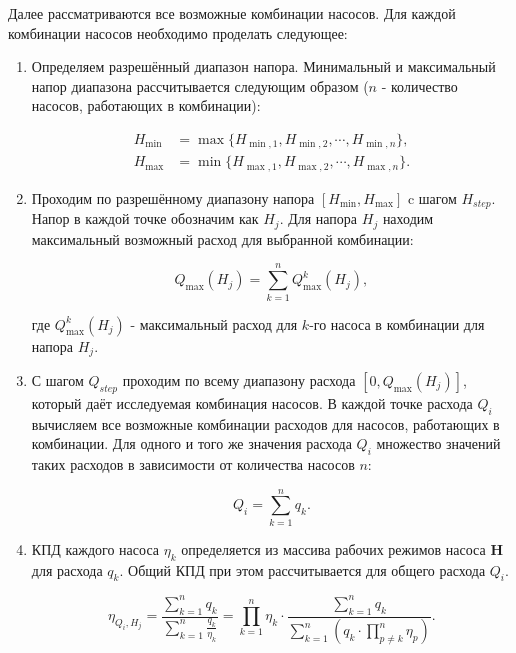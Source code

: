 \documentclass[a4paper, 12pt]{article}
\begin{document}
    Далее рассматриваются все возможные комбинации насосов. Для каждой
комбинации насосов необходимо проделать следующее: 

\begin{enumerate}

\item
Определяем разрешённый диапазон напора. Минимальный и максимальный напор диапазона
рассчитывается следующим образом (\(n\) - количество насосов, работающих
в комбинации):

\begin{equation}
	\begin{aligned}
		H_{\min} &= \max\{H_{\min,1}, H_{\min,2}, \cdots, H_{\min,n}\}, \\
		H_{\max} &= \min\{H_{\max,1}, H_{\max,2}, \cdots, H_{\max,n}\}.
	\end{aligned}
\end{equation}


\item
Проходим по разрешённому диапазону напора \([H_{\min}, H_{\max}]\) c
  шагом \(H_{step}\). Напор в каждой точке обозначим как \(H_j\). Для
  напора \(H_j\) находим максимальный возможный расход для выбранной комбинации:

\begin{equation}
	Q_{\max}(H_j) = \sum_{k=1}^{n} Q_{\max}^k(H_j),
\end{equation}

\noindent где $Q_{\max}^k(H_j)$ - максимальный расход для $k$-го насоса в комбинации для напора $H_j$.

\item
  С шагом \(Q_{step}\) проходим по всему диапазону
  расхода \([0, Q_{\max}(H_j)]\), который даёт исследуемая комбинация
  насосов. В каждой точке расхода \(Q_i\) вычисляем все возможные
  комбинации расходов для насосов, работающих в комбинации. Для одного и
  того же значения расхода \(Q_i\) множество значений таких расходов в
  зависимости от количества насосов \(n\):

\begin{equation}
	Q_i = \sum_{k=1}^{n} q_k.
\end{equation}


\item
  КПД каждого насоса $\eta_k$ определяется из массива рабочих режимов насоса
  \(\mathbf{H}\) для расхода $q_k$. Общий КПД при этом рассчитывается для общего расхода
  \(Q_i\).

\begin{equation}
	\eta_{Q_i, H_j} = \frac{\sum_{k=1}^{n} q_k}{\sum_{k=1}^{n} \frac{q_k}{\eta_k}} = \prod_{k=1}^{n} \eta_k \cdot \frac{\sum_{k=1}^{n} q_k}{\sum_{k=1}^{n} (q_k \cdot \prod_{p \ne k}^{n} \eta_p)}.
\end{equation}


\end{enumerate}
\end{document}
